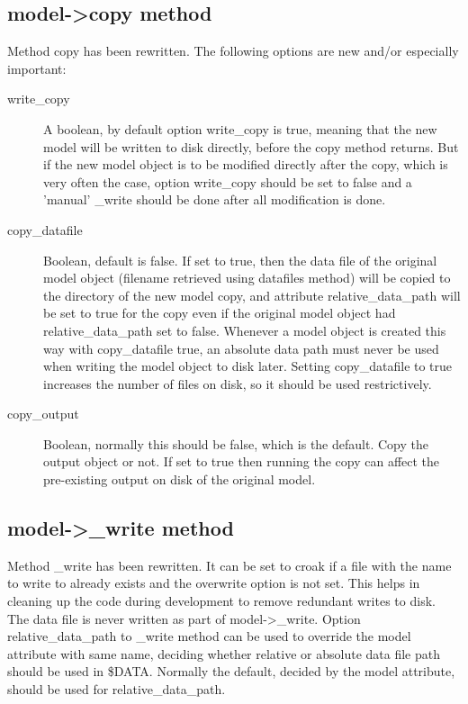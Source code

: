 \subsection{model->copy method}
Method copy has been rewritten. The following options are new and/or especially important:
\begin{description}
\item[write\_copy] A boolean, by default option write\_copy is true, meaning that the new model will be written to disk
directly, before the copy method returns. But if the new model object is to be modified directly after the copy,
which is very often the case, option write\_copy should be set to false and a 'manual' \_write should be done
after all modification is done.
\item[copy\_datafile] Boolean, default is false. If set to true, then the data file of the original model object (filename
retrieved using datafiles method) will be copied to the directory of the new model copy, and attribute
relative\_data\_path will be set to true for the copy even if the original model object had
relative\_data\_path set to false.
Whenever a model object is created this way with copy\_datafile true, an absolute data path must never
be used when writing the model object to disk later.
Setting copy\_datafile to true increases the number of files on disk, so it should be used restrictively.
\item[copy\_output] Boolean, normally this should be false, which is the default. Copy the output object or not.
If set to true then running the copy can affect the pre-existing output on disk of the original model.
\end{description}

\subsection{model->\_write method}
Method \_write has been rewritten.
It can be set to croak if a file with the name to write to already exists and the overwrite option is not set. This
helps in cleaning up the code during development
to remove redundant writes to disk.
The data file is never written as part of model->\_write.
Option relative\_data\_path to \_write method can be used to override the model attribute with same name,
deciding whether relative or absolute data file path should be used in \$DATA.
Normally the default, decided by the model attribute, should be used for relative\_data\_path.

